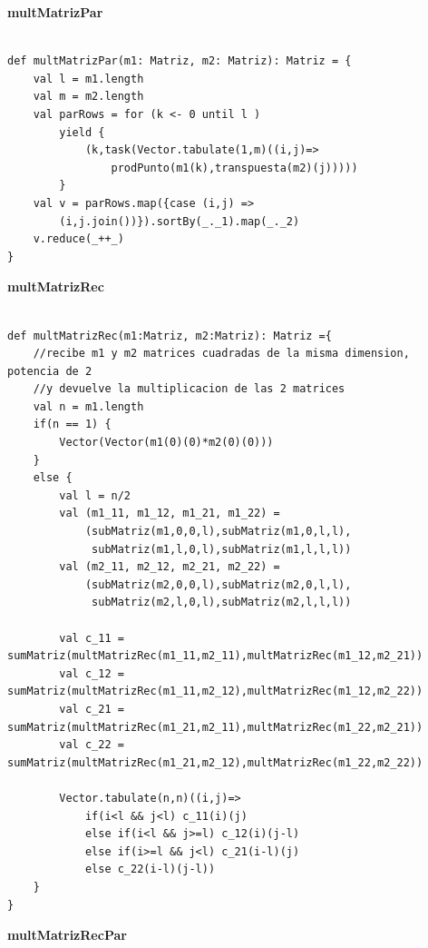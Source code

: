 \documentclass[12pt, a4paper]{article}
\begin{document}
\textbf{{multMatrizPar}} \\ \\
\begin{lstlisting}[caption=mult matriz paralela, label=lst:scala_code7]
def multMatrizPar(m1: Matriz, m2: Matriz): Matriz = {
    val l = m1.length
    val m = m2.length
    val parRows = for (k <- 0 until l ) 
        yield {
            (k,task(Vector.tabulate(1,m)((i,j)=>
                prodPunto(m1(k),transpuesta(m2)(j)))))
        }
    val v = parRows.map({case (i,j) => 
        (i,j.join())}).sortBy(_._1).map(_._2)
    v.reduce(_++_)
}
\end{lstlisting}
\textbf{{multMatrizRec}} \\ \\
\begin{lstlisting}[caption=mult matriz recursiva, label=lst:scala_code8]
def multMatrizRec(m1:Matriz, m2:Matriz): Matriz ={
    //recibe m1 y m2 matrices cuadradas de la misma dimension, potencia de 2
    //y devuelve la multiplicacion de las 2 matrices
    val n = m1.length
    if(n == 1) {
        Vector(Vector(m1(0)(0)*m2(0)(0)))
    }
    else {
        val l = n/2
        val (m1_11, m1_12, m1_21, m1_22) = 
            (subMatriz(m1,0,0,l),subMatriz(m1,0,l,l),
             subMatriz(m1,l,0,l),subMatriz(m1,l,l,l))
        val (m2_11, m2_12, m2_21, m2_22) =
            (subMatriz(m2,0,0,l),subMatriz(m2,0,l,l),
             subMatriz(m2,l,0,l),subMatriz(m2,l,l,l))

        val c_11 = sumMatriz(multMatrizRec(m1_11,m2_11),multMatrizRec(m1_12,m2_21))
        val c_12 = sumMatriz(multMatrizRec(m1_11,m2_12),multMatrizRec(m1_12,m2_22))
        val c_21 = sumMatriz(multMatrizRec(m1_21,m2_11),multMatrizRec(m1_22,m2_21))
        val c_22 = sumMatriz(multMatrizRec(m1_21,m2_12),multMatrizRec(m1_22,m2_22))

        Vector.tabulate(n,n)((i,j)=>
            if(i<l && j<l) c_11(i)(j)
            else if(i<l && j>=l) c_12(i)(j-l)
            else if(i>=l && j<l) c_21(i-l)(j)
            else c_22(i-l)(j-l))
    }
}
\end{lstlisting}
\textbf{{multMatrizRecPar}} \\ \\
\end{document}
